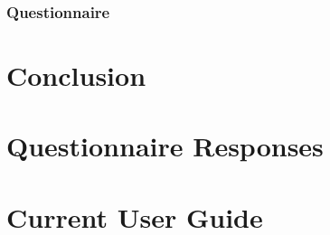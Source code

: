 \documentclass{l3proj}
\begin{document}
\subsection{Questionnaire}
\label{eval:question}


\chapter{Conclusion}
\label{conc}

\appendix

\chapter{Questionnaire Responses}
\label{app:questionnaireResponses}


\chapter{Current User Guide}
\label{app:userGuideCurrent}


\clearpage


\end{document}
